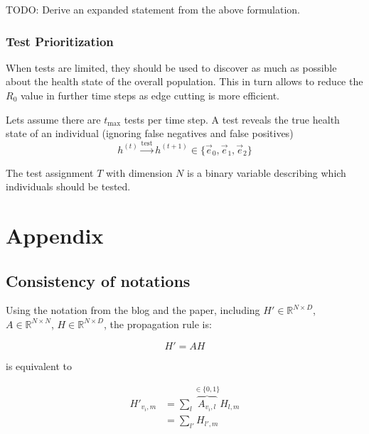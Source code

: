 \documentclass[]{article}
\begin{document}
TODO: Derive an expanded statement from the above formulation.\\

\subsubsection{Test Prioritization}
When tests are limited, they should be used to discover as much as possible about the health state of the overall population.
This in turn allows to reduce the $R_0$ value in further time steps as edge cutting is more efficient.

Lets assume there are $t_{\text{max}}$ tests per time step.
A test reveals the true health state of an individual (ignoring false negatives and false positives)
\begin{equation}
	h^{(t)} \xrightarrow{\text{test}} h^{(t+1)} \in \{\vec{e}_0, \vec{e}_1, \vec{e}_2 \}
\end{equation}

The test assignment $T$ with dimension $N$ is a binary variable describing which individuals should be tested.

\section{Appendix}

\subsection{Consistency of notations}
\label{sec:consistency}

Using the notation from the blog and the paper, including $H'\in\mathbb{R}^{N\times D}$, $A\in\mathbb{R}^{N\times N}$, $H\in\mathbb{R}^{N\times D}$, the propagation rule is:

\begin{equation}
	H' = A H
\end{equation}

is equivalent to

\begin{equation}
	\begin{split}
		H'_{v_i, m} & = \sum_l \overbrace{A_{v_i, l}}^{\in \{0, 1\}} H_{l, m} \\
		            & = \sum_{l'} H_{l',m}
	\end{split}
\end{equation}
\end{document}
